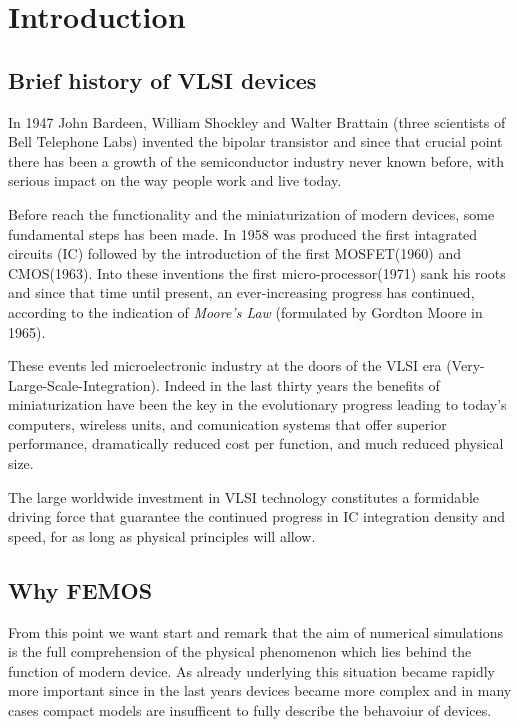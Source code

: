 \chapter{Introduction}
\section{Brief history of VLSI devices}


In 1947 John Bardeen, William Shockley and Walter Brattain (three scientists of Bell Telephone Labs) invented the bipolar transistor and since that crucial point there has been a growth  of the semiconductor industry never known before, with serious impact on the way people work and live today. 

Before reach the functionality and the miniaturization of modern devices, some fundamental steps has been made.
In 1958 was produced the first intagrated circuits (IC)  followed by the introduction of the first MOSFET(1960) and CMOS(1963). Into these inventions the first micro-processor(1971) sank his roots  and since that time until present, an ever-increasing progress has continued, according to the indication of \textit{Moore's Law} (formulated by Gordton Moore in 1965).

These events led microelectronic industry at the doors of the VLSI era (Very-Large-Scale-Integration). Indeed in the last thirty years the benefits of miniaturization have been the key in the evolutionary progress leading to today's computers, wireless units, and comunication systems that offer superior performance, dramatically reduced cost per function, and much reduced physical size.

The large worldwide investment in VLSI technology constitutes a formidable driving force that guarantee the continued progress in IC integration density and speed, for as long as physical principles will allow.

\section{Why FEMOS}

From this point we want start and remark that the aim of numerical simulations is the full comprehension of the physical phenomenon which lies behind the function of modern device. As already underlying this situation became rapidly more important since in the last years devices became more complex and in many cases compact models are insufficent to fully describe the behavoiur of devices.

